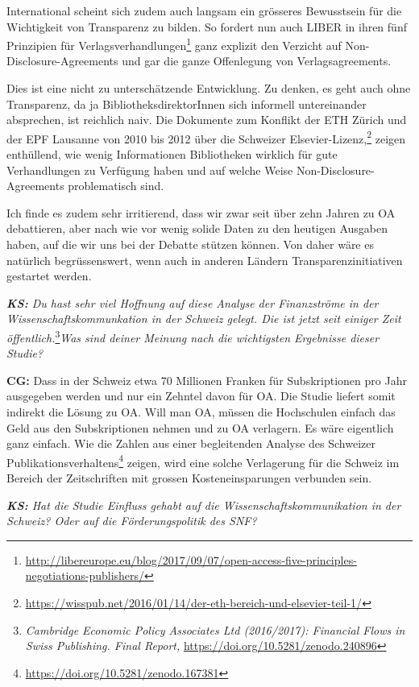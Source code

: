 \documentclass[a4paper,
fontsize=11pt,
oneside,
numbers=noperiodatend,
parskip=half-,
bibliography=totoc,
final
]{scrartcl}
\begin{document}
International scheint sich zudem auch langsam ein grösseres Bewusstsein
für die Wichtigkeit von Transparenz zu bilden. So fordert nun auch LIBER
in ihren fünf Prinzipien für Verlagsverhandlungen\footnote{\url{http://libereurope.eu/blog/2017/09/07/open-access-five-principles-negotiations-publishers/}}
ganz explizit den Verzicht auf Non-Disclosure-Agreements und gar die
ganze Offenlegung von Verlagsagreements.

Dies ist eine nicht zu unterschätzende Entwicklung. Zu denken, es geht
auch ohne Transparenz, da ja BibliotheksdirektorInnen sich informell
untereinander absprechen, ist reichlich naiv. Die Dokumente zum Konflikt
der ETH Zürich und der EPF Lausanne von 2010 bis 2012 über die Schweizer
Elsevier-Lizenz,\footnote{\url{https://wisspub.net/2016/01/14/der-eth-bereich-und-elsevier-teil-1/}}
zeigen enthüllend, wie wenig Informationen Bibliotheken wirklich für
gute Verhandlungen zu Verfügung haben und auf welche Weise
Non-Disclosure-Agreements problematisch sind.

Ich finde es zudem sehr irritierend, dass wir zwar seit über zehn Jahren
zu OA debattieren, aber nach wie vor wenig solide Daten zu den heutigen
Ausgaben haben, auf die wir uns bei der Debatte stützen können. Von
daher wäre es natürlich begrüssenswert, wenn auch in anderen Ländern
Transparenzinitiativen gestartet werden.

\emph{\textbf{KS:} Du hast sehr viel Hoffnung auf diese Analyse der
Finanzströme in der Wissenschaftskommunkation in der Schweiz gelegt. Die
ist jetzt seit einiger Zeit öffentlich.}\footnote{\emph{Cambridge
  Economic Policy Associates Ltd (2016/2017): Financial Flows in Swiss
  Publishing. Final Report,} \url{https://doi.org/10.5281/zenodo.240896}}\emph{Was
sind deiner Meinung nach die wichtigsten Ergebnisse dieser Studie?}

\textbf{CG:} Dass in der Schweiz etwa 70 Millionen Franken für
Subskriptionen pro Jahr ausgegeben werden und nur ein Zehntel davon für
OA. Die Studie liefert somit indirekt die Lösung zu OA. Will man OA,
müssen die Hochschulen einfach das Geld aus den Subskriptionen nehmen
und zu OA verlagern. Es wäre eigentlich ganz einfach. Wie die Zahlen aus
einer begleitenden Analyse des Schweizer
Publikationsverhaltens\footnote{\url{https://doi.org/10.5281/zenodo.167381}}
zeigen, wird eine solche Verlagerung für die Schweiz im Bereich der
Zeitschriften mit grossen Kosteneinsparungen verbunden sein.

\emph{\textbf{KS:} Hat die Studie Einfluss gehabt auf die
Wissenschaftskommunikation in der Schweiz? Oder auf die
Förderungspolitik des SNF?}
\end{document}
